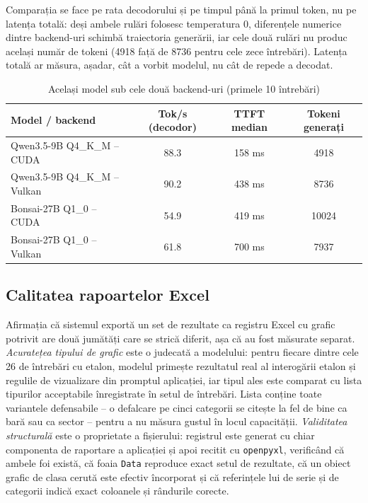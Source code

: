 \documentclass[12pt, a4paper]{report}
\newcommand{\code}[1]{\texttt{#1}}
\begin{document}
Comparația se face pe rata decodorului și pe timpul până la primul token, nu pe
latența totală: deși ambele rulări folosesc temperatura 0, diferențele numerice
dintre backend-uri schimbă traiectoria generării, iar cele două rulări nu produc
același număr de tokeni (4918 față de 8736 pentru cele zece întrebări). Latența
totală ar măsura, așadar, cât a vorbit modelul, nu cât de repede a decodat.

\begin{table}[H]
\centering
\caption{Același model sub cele două backend-uri (primele 10 întrebări)}
\label{tab:backend}
\begin{tabular}{l c c c}
\toprule
\textbf{Model / backend} & \textbf{Tok/s (decodor)} & \textbf{TTFT median} & \textbf{Tokeni generați} \\
\midrule
Qwen3.5-9B Q4\_K\_M -- CUDA & 88.3 & 158 ms & 4918 \\
Qwen3.5-9B Q4\_K\_M -- Vulkan & 90.2 & 438 ms & 8736 \\
\midrule
Bonsai-27B Q1\_0 -- CUDA & 54.9 & 419 ms & 10024 \\
Bonsai-27B Q1\_0 -- Vulkan & 61.8 & 700 ms & 7937 \\
\bottomrule
\end{tabular}
\end{table}

\subsection{Calitatea rapoartelor Excel}

Afirmația că sistemul exportă un set de rezultate ca registru Excel cu grafic
potrivit are două jumătăți care se strică diferit, așa că au fost măsurate
separat. \emph{Acuratețea tipului de grafic} este o judecată a modelului:
pentru fiecare dintre cele 26 de întrebări cu etalon, modelul primește
rezultatul real al interogării etalon și regulile de vizualizare din promptul
aplicației, iar tipul ales este comparat cu lista tipurilor acceptabile
înregistrate în setul de întrebări. Lista conține toate variantele defensabile
-- o defalcare pe cinci categorii se citește la fel de bine ca bară sau ca
sector -- pentru a nu măsura gustul în locul capacității. \emph{Validitatea
structurală} este o proprietate a fișierului: registrul este generat cu chiar
componenta de raportare a aplicației și apoi recitit cu \code{openpyxl},
verificând că ambele foi există, că foaia \code{Data} reproduce exact setul de
rezultate, că un obiect grafic de clasa cerută este efectiv încorporat și că
referințele lui de serie și de categorii indică exact coloanele și rândurile
corecte.
\end{document}
